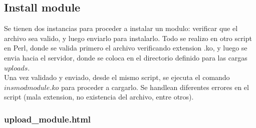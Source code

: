 \documentclass{article}
\begin{document}
\subsection{Install module}
Se tienen dos instancias para proceder a instalar un modulo: verificar que el archivo sea valido, y luego enviarlo para instalarlo. Todo se realizo en otro script en Perl, donde se valida primero el archivo verificando extension .ko, y luego
se envia hacia el servidor, donde se coloca en el directorio definido para las cargas $uploads$. \\
Una vez validado y enviado, desde el mismo script, se ejecuta el comando $insmod module.ko$ para proceder a cargarlo. Se handlean diferentes errores en el script (mala extension, no existencia del archivo, entre otros).\\

\subsubsection{upload\_module.html}

   
   \bigskip
   
\end{document}

